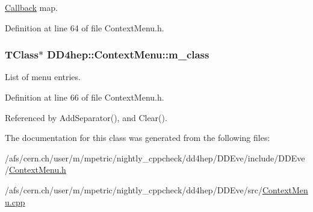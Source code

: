 \hyperlink{class_d_d4hep_1_1_callback}{Callback} map. 

Definition at line 64 of file ContextMenu.h.\hypertarget{class_d_d4hep_1_1_context_menu_ad9be22966c34ce07b6e83b2195bddad1}{
\subsubsection[{m\_\-class}]{\setlength{\rightskip}{0pt plus 5cm}TClass$\ast$ {\bf DD4hep::ContextMenu::m\_\-class}}}
\label{class_d_d4hep_1_1_context_menu_ad9be22966c34ce07b6e83b2195bddad1}


List of menu entries. 

Definition at line 66 of file ContextMenu.h.

Referenced by AddSeparator(), and Clear().

The documentation for this class was generated from the following files:\begin{DoxyCompactItemize}
\item 
/afs/cern.ch/user/m/mpetric/nightly\_\-cppcheck/dd4hep/DDEve/include/DDEve/\hyperlink{_context_menu_8h}{ContextMenu.h}\item 
/afs/cern.ch/user/m/mpetric/nightly\_\-cppcheck/dd4hep/DDEve/src/\hyperlink{_context_menu_8cpp}{ContextMenu.cpp}\end{DoxyCompactItemize}
